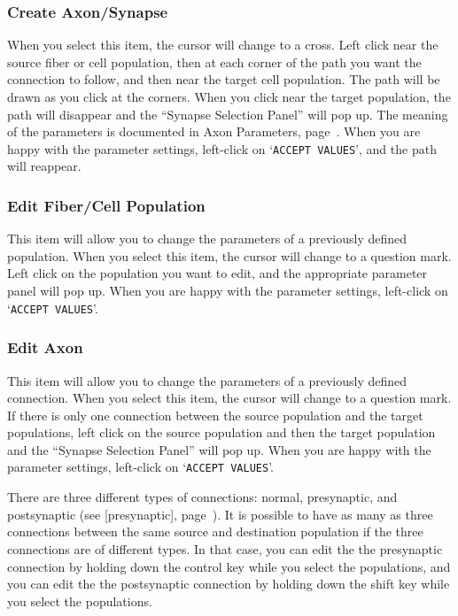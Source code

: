 \documentclass[12pt,openany,oneside]{book}
\newcommand{\tisamp}[1]{`\texttt{#1}'}
\newcommand{\tiref}[1]{#1, page~\pageref{#1}}
\newcommand{\tipxref}[1]{see [#1], page~\pageref{#1}}
\begin{document}
\subsubsection*{Create Axon/Synapse}

When you select this item, the cursor will change to a cross.  Left
click near the source fiber or cell population, then at each corner of
the path you want the connection to follow, and then near the target
cell population.  The path will be drawn as you click at the corners.
When you click near the target population, the path will disappear and
the ``Synapse Selection Panel'' will pop up.  The meaning of the
parameters is documented in \tiref{Axon Parameters}.  When you are happy
with the parameter settings, left-click on \tisamp{ACCEPT VALUES}, and
the path will reappear.

\subsubsection*{Edit Fiber/Cell Population}

This item will allow you to change the parameters of a previously
defined population.  When you select this item, the cursor will change
to a question mark.  Left click on the population you want to edit,
and the appropriate parameter panel will pop up.   When you are
happy with the parameter settings, left-click on \tisamp{ACCEPT VALUES}.

\subsubsection*{Edit Axon}
\label{Edit Axon}

This item will allow you to change the parameters of a previously
defined connection.  When you select this item, the cursor will change
to a question mark.  If there is only one connection between the
source population and the target populations, left click on the source
population and then the target population and the ``Synapse Selection
Panel'' will pop up.  When you are happy with the parameter settings,
left-click on \tisamp{ACCEPT VALUES}.

There are three different types of connections: normal, presynaptic,
and postsynaptic (\tipxref{presynaptic}).  It is possible to have as many
as three connections between the same source and destination
population if the three connections are of different types.  In that
case, you can edit the the presynaptic connection by holding down the
control key while you select the populations, and you can edit the the
postsynaptic connection by holding down the shift key while you select
the populations.
\end{document}
